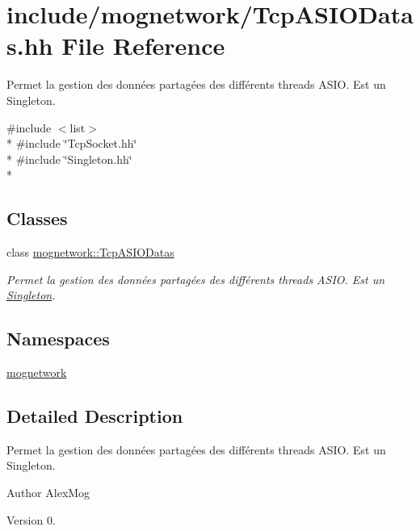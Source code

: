 \hypertarget{_tcp_a_s_i_o_datas_8hh}{\section{include/mognetwork/\-Tcp\-A\-S\-I\-O\-Datas.hh File Reference}
\label{_tcp_a_s_i_o_datas_8hh}
}


Permet la gestion des données partagées des différents threads A\-S\-I\-O. Est un Singleton.  


{\ttfamily \#include $<$list$>$}\\*
{\ttfamily \#include \char`\"{}Tcp\-Socket.\-hh\char`\"{}}\\*
{\ttfamily \#include \char`\"{}Singleton.\-hh\char`\"{}}\\*
\subsection*{Classes}
\begin{DoxyCompactItemize}
\item 
class \hyperlink{classmognetwork_1_1_tcp_a_s_i_o_datas}{mognetwork\-::\-Tcp\-A\-S\-I\-O\-Datas}
\begin{DoxyCompactList}\small\item\em Permet la gestion des données partagées des différents threads A\-S\-I\-O. Est un \hyperlink{classmognetwork_1_1_singleton}{Singleton}. \end{DoxyCompactList}\end{DoxyCompactItemize}
\subsection*{Namespaces}
\begin{DoxyCompactItemize}
\item 
\hyperlink{namespacemognetwork}{mognetwork}
\end{DoxyCompactItemize}


\subsection{Detailed Description}
Permet la gestion des données partagées des différents threads A\-S\-I\-O. Est un Singleton. \begin{DoxyAuthor}{Author}
Alex\-Mog 
\end{DoxyAuthor}
\begin{DoxyVersion}{Version}
0. 
\end{DoxyVersion}
